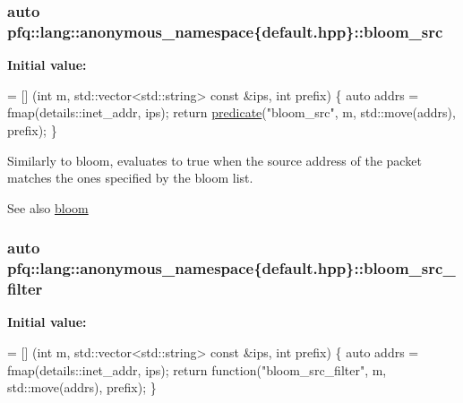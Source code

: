 \subsubsection[{\texorpdfstring{bloom\+\_\+src}{bloom_src}}]{\setlength{\rightskip}{0pt plus 5cm}auto pfq\+::lang\+::anonymous\+\_\+namespace\{default.\+hpp\}\+::bloom\+\_\+src}\hypertarget{namespacepfq_1_1lang_1_1anonymous__namespace_02default_8hpp_03_aa2a8ff506d61e93d8eca4419513970f4}{}\label{namespacepfq_1_1lang_1_1anonymous__namespace_02default_8hpp_03_aa2a8ff506d61e93d8eca4419513970f4}
{\bfseries Initial value\+:}
\begin{DoxyCode}
= [] (\textcolor{keywordtype}{int} m, std::vector<std::string> \textcolor{keyword}{const} &ips, \textcolor{keywordtype}{int} prefix) \{
                                \textcolor{keyword}{auto} addrs = fmap(details::inet\_addr, ips);
                                \textcolor{keywordflow}{return} \hyperlink{namespacepfq_1_1lang_aca9adafc436b7f851621b979fa1aaf88}{predicate}(\textcolor{stringliteral}{"bloom\_src"}, m, std::move(addrs), prefix);
                          \}
\end{DoxyCode}
Similarly to {\ttfamily bloom}, evaluates to {\ttfamily true} when the source address of the packet matches the ones specified by the bloom list. \begin{DoxySeeAlso}{See also}
\hyperlink{namespacepfq_1_1lang_1_1anonymous__namespace_02default_8hpp_03_abfcd230137acb93cfd99f7a0a7c1f17f}{bloom} 
\end{DoxySeeAlso}
\subsubsection[{\texorpdfstring{bloom\+\_\+src\+\_\+filter}{bloom_src_filter}}]{\setlength{\rightskip}{0pt plus 5cm}auto pfq\+::lang\+::anonymous\+\_\+namespace\{default.\+hpp\}\+::bloom\+\_\+src\+\_\+filter}\hypertarget{namespacepfq_1_1lang_1_1anonymous__namespace_02default_8hpp_03_a04d4dfefacab3230f7d17f0f797cd37e}{}\label{namespacepfq_1_1lang_1_1anonymous__namespace_02default_8hpp_03_a04d4dfefacab3230f7d17f0f797cd37e}
{\bfseries Initial value\+:}
\begin{DoxyCode}
= [] (\textcolor{keywordtype}{int} m, std::vector<std::string> \textcolor{keyword}{const} &ips, \textcolor{keywordtype}{int} prefix) \{
                                    \textcolor{keyword}{auto} addrs = fmap(details::inet\_addr, ips);
                                    \textcolor{keywordflow}{return} \textcolor{keyword}{function}(\textcolor{stringliteral}{"bloom\_src\_filter"}, m, std::move(addrs), prefix);
                                \}
\end{DoxyCode}


